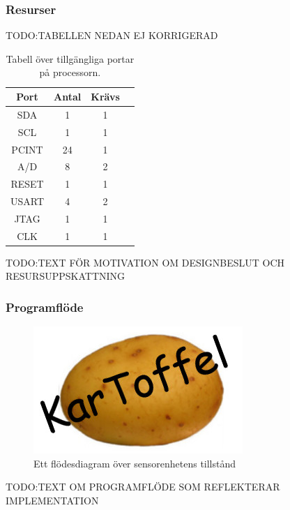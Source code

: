 \documentclass{article}
\begin{document}
\subsubsection{Resurser}

TODO:TABELLEN NEDAN EJ KORRIGERAD
\begin{table}[H]
  \centering
  \begin{tabular}{ | c | c | c | c |}
    \hline
    \textbf{Port} & \textbf{Antal} & \textbf{Krävs} \\
    \hline
    SDA & 1 & 1 \\
    \hline
    SCL & 1 & 1 \\
    \hline
    PCINT & 24 & 1 \\
    \hline
    A/D & 8 & 2 \\
    \hline
    RESET & 1 & 1 \\
    \hline
    USART & 4 & 2 \\
    \hline
    JTAG & 1 & 1 \\
    \hline
    CLK & 1 & 1 \\
    \hline
  \end{tabular}
  \caption{Tabell över tillgängliga portar på processorn.}
\end{table}

TODO:TEXT FÖR MOTIVATION OM DESIGNBESLUT OCH RESURSUPPSKATTNING


\subsubsection{Programflöde}

\begin{figure}[H]
\centering
\includegraphics[scale=0.6]{Logo}
\caption{Ett flödesdiagram över sensorenhetens tillstånd}
\label{fig:sensorenhet_flowchart}
\end{figure}
TODO:TEXT OM PROGRAMFLÖDE SOM REFLEKTERAR IMPLEMENTATION
\end{document}
